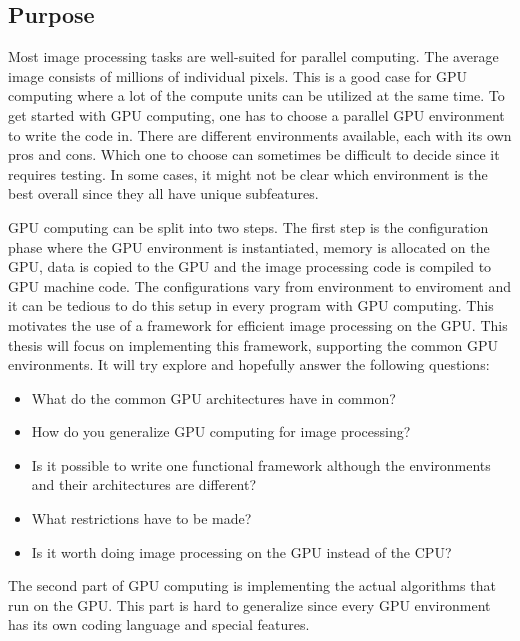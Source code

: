 \subsection{Purpose}

Most image processing tasks are well-suited for parallel computing. The average image consists of millions of individual pixels. This is a good case for GPU computing where a lot of the compute units can be utilized at the same time. To get started with GPU computing, one has to choose a parallel GPU environment to write the code in. There are different environments available, each with its own pros and cons. Which one to choose can sometimes be difficult to decide since it requires testing. In some cases, it might not be clear which environment is the best overall since they all have unique subfeatures.
\newline

GPU computing can be split into two steps. The first step is the configuration phase where the GPU environment is instantiated, memory is allocated on the GPU, data is copied to the GPU and the image processing code is compiled to GPU machine code. The configurations vary from environment to enviroment and it can be tedious to do this setup in every program with GPU computing. This motivates the use of a framework for efficient image processing on the GPU. This thesis will focus on implementing this framework, supporting the common GPU environments. It will try explore and hopefully answer the following questions:
\newline

\begin{itemize}
\item{What do the common GPU architectures have in common?}
\item{How do you generalize GPU computing for image processing?}
\item{Is it possible to write one functional framework although the environments and their architectures are different?}
\item{What restrictions have to be made?}
\item{Is it worth doing image processing on the GPU instead of the CPU?}
\end{itemize}

The second part of GPU computing is implementing the actual algorithms that run on the GPU. This part is hard to generalize since every GPU environment has its own coding language and special features. 
\newline

